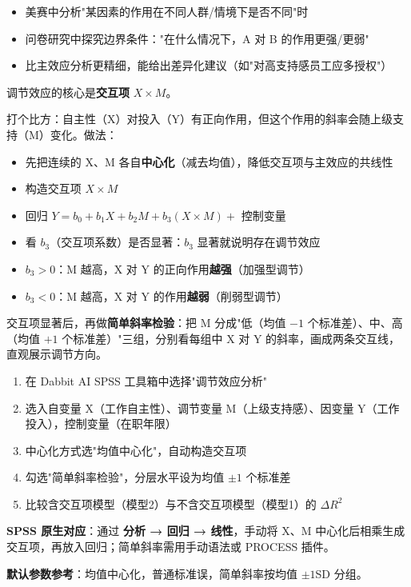 \begin{algoscene}
\begin{itemize}
    \item 美赛中分析"某因素的作用在不同人群/情境下是否不同"时
    \item 问卷研究中探究边界条件："在什么情况下，A 对 B 的作用更强/更弱"
    \item 比主效应分析更精细，能给出差异化建议（如"对高支持感员工应多授权"）
\end{itemize}
\end{algoscene}

\begin{algoprinciple}
调节效应的核心是\textbf{交互项} $X \times M$。

打个比方：自主性（X）对投入（Y）有正向作用，但这个作用的斜率会随上级支持（M）变化。做法：

\begin{itemize}
    \item 先把连续的 X、M 各自\textbf{中心化}（减去均值），降低交互项与主效应的共线性
    \item 构造交互项 $X \times M$
    \item 回归 $Y = b_0 + b_1 X + b_2 M + b_3 (X \times M) + $ 控制变量
    \item 看 $b_3$（交互项系数）是否显著：$b_3$ 显著就说明存在调节效应
\end{itemize}

\begin{itemize}
    \item $b_3 > 0$：M 越高，X 对 Y 的正向作用\textbf{越强}（加强型调节）
    \item $b_3 < 0$：M 越高，X 对 Y 的作用\textbf{越弱}（削弱型调节）
\end{itemize}

交互项显著后，再做\textbf{简单斜率检验}：把 M 分成"低（均值 $-1$ 个标准差）、中、高（均值 $+1$ 个标准差）"三组，分别看每组中 X 对 Y 的斜率，画成两条交互线，直观展示调节方向。
\end{algoprinciple}

\begin{algosposs}
\begin{enumerate}
    \item 在 Dabbit AI SPSS 工具箱中选择"调节效应分析"
    \item 选入自变量 X（工作自主性）、调节变量 M（上级支持感）、因变量 Y（工作投入），控制变量（在职年限）
    \item 中心化方式选"均值中心化"，自动构造交互项
    \item 勾选"简单斜率检验"，分层水平设为均值 $\pm 1$ 个标准差
    \item 比较含交互项模型（模型2）与不含交互项模型（模型1）的 $\Delta R^2$
\end{enumerate}

\textbf{SPSS 原生对应}：通过 \textbf{分析 → 回归 → 线性}，手动将 X、M 中心化后相乘生成交互项，再放入回归；简单斜率需用手动语法或 PROCESS 插件。

\textbf{默认参数参考}：均值中心化，普通标准误，简单斜率按均值 $\pm 1$SD 分组。
\end{algosposs}


